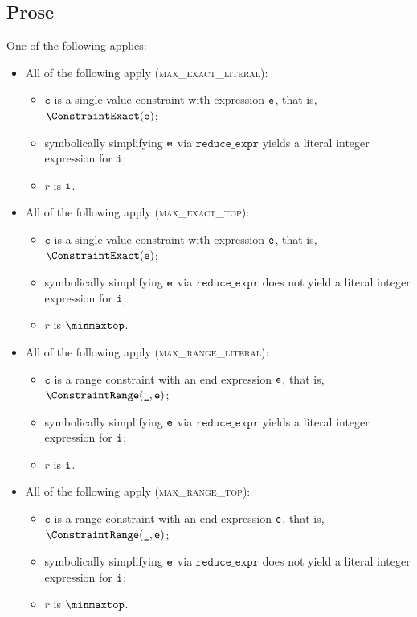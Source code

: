 \documentclass{book}
\newcommand\reduceexpr[0]{\texttt{reduce\_expr}}
\newcommand\vc[0]{\texttt{c}}
\begin{document}
\subsection{Prose}
One of the following applies:
\begin{itemize}
  \item All of the following apply (\textsc{max\_exact\_literal}):
  \begin{itemize}
    \item $\vc$ is a single value constraint with expression $\texttt{e}$, that is, $\ConstraintExact(\ve)$;
    \item symbolically simplifying $\texttt{e}$ via $\reduceexpr$ yields a literal integer expression for $\texttt{i}$;
    \item $r$ is $\texttt{i}$.
  \end{itemize}

  \item All of the following apply (\textsc{max\_exact\_top}):
  \begin{itemize}
    \item $\vc$ is a single value constraint with expression $\texttt{e}$, that is, $\ConstraintExact(\ve)$;
    \item symbolically simplifying $\texttt{e}$ via $\reduceexpr$ does not yield a literal integer expression for $\texttt{i}$;
    \item $r$ is $\minmaxtop$.
  \end{itemize}

  \item All of the following apply (\textsc{max\_range\_literal}):
  \begin{itemize}
    \item $\vc$ is a range constraint with an end expression $\texttt{e}$, that is, $\ConstraintRange(\Ignore, \ve)$;
    \item symbolically simplifying $\texttt{e}$ via $\reduceexpr$ yields a literal integer expression for $\texttt{i}$;
    \item $r$ is $\texttt{i}$.
  \end{itemize}

  \item All of the following apply (\textsc{max\_range\_top}):
  \begin{itemize}
    \item $\vc$ is a range constraint with an end expression $\texttt{e}$, that is, $\ConstraintRange(\Ignore, \ve)$;
    \item symbolically simplifying $\texttt{e}$ via $\reduceexpr$ does not yield a literal integer expression for $\texttt{i}$;
    \item $r$ is $\minmaxtop$.
  \end{itemize}
\end{itemize}
\end{document}
